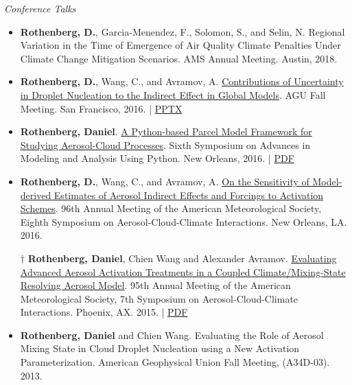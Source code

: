 \documentclass[11pt,letterpaper]{article}
\begin{document}
\bigskip
\emph{Conference Talks}
\medskip
\begin{itemize}[itemindent=-10pt]

 \item \textbf{Rothenberg, D.}, Garcia-Menendez, F., Solomon, S., and Selin, N. Regional Variation in the Time of Emergence of Air Quality Climate Penalties Under Climate Change Mitigation Scenarios. AMS Annual Meeting. Austin, 2018.

 \item \textbf{Rothenberg, D.}, Wang, C., and Avramov, A.
 \href{https://agu.confex.com/agu/fm16/meetingapp.cgi/Paper/193282}{Contributions of Uncertainty in Droplet Nucleation to the Indirect Effect in Global Models}. AGU Fall Meeting. San Francisco, 2016. | \href{https://figshare.com/articles/Contributions_of_Uncertainty_in_Droplet_Nucleation_to_the_Indirect_Effect_in_Global_Models/4503047}{PPTX}

 \item \textbf{Rothenberg, Daniel}. \href{https://ams.confex.com/ams/96Annual/webprogram/Paper286193.html}{A Python-based Parcel Model Framework for Studying Aerosol-Cloud Processes}. Sixth Symposium on Advances in Modeling and Analysis Using Python. New Orleans, 2016. | \href{https://figshare.com/articles/A_Python-based_Parcel_Model_Framework_for_Studying_Aerosol-Cloud_Processes/3475241}{PDF}

 \item \textbf{Rothenberg, D.}, Wang, C., and Avramov, A. \href{https://ams.confex.com/ams/96Annual/webprogram/Paper289914.html}{On the Sensitivity of Model-derived Estimates of Aerosol Indirect Effects and Forcings to Activation Schemes}. 96th Annual Meeting of the American Meteorological Society, Eighth Symposium on Aerosol-Cloud-Climate Interactions. New Orleans, LA. 2016.

 \item[$\dagger$] \textbf{Rothenberg, Daniel}, Chien Wang and Alexander Avramov. \href{https://ams.confex.com/ams/95Annual/webprogram/Paper268747.html}{Evaluating Advanced Aerosol Activation Treatments in a Coupled Climate/Mixing-State Resolving Aerosol Model}. 95th Annual Meeting of the American Meteorological Society, 7th Symposium on Aerosol-Cloud-Climate Interactions. Phoenix, AX. 2015. | \href{https://figshare.com/articles/Evaluating_Advanced_Aerosol_Activation_Treatments_in_a_Coupled_Climate_Mixing-State_Resolving_Aerosol_Model/3475226}{PDF}

 \item \textbf{Rothenberg, Daniel} and Chien Wang. Evaluating the Role of Aerosol Mixing State in Cloud Droplet Nucleation using a New Activation Parameterization. American Geophysical Union Fall Meeting, (A34D-03). 2013.


\end{itemize}
\end{document}
